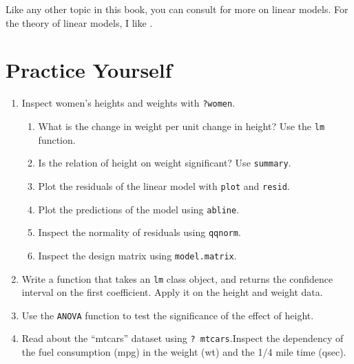 \documentclass[]{book}
\providecommand{\tightlist}{%
  \setlength{\itemsep}{0pt}\setlength{\parskip}{0pt}}
\theoremstyle{definition}
\theoremstyle{definition}
\theoremstyle{definition}
\theoremstyle{remark}
\begin{document}
Like any other topic in this book, you can consult
\citet{venables2013modern} for more on linear models. For the theory of
linear models, I like \citet{greene2003econometric}.

\section{Practice Yourself}\label{practice-yourself-3}

\begin{enumerate}
\def\labelenumi{\arabic{enumi}.}
\item
  Inspect women's heights and weights with \texttt{?women}.

  \begin{enumerate}
  \def\labelenumii{\arabic{enumii}.}
  \tightlist
  \item
    What is the change in weight per unit change in height? Use the
    \texttt{lm} function.
  \item
    Is the relation of height on weight significant? Use
    \texttt{summary}.
  \item
    Plot the residuals of the linear model with \texttt{plot} and
    \texttt{resid}.
  \item
    Plot the predictions of the model using \texttt{abline}.
  \item
    Inspect the normality of residuals using \texttt{qqnorm}.
  \item
    Inspect the design matrix using \texttt{model.matrix}.
  \end{enumerate}
\item
  Write a function that takes an \texttt{lm} class object, and returns
  the confidence interval on the first coefficient. Apply it on the
  height and weight data.
\item
  Use the \texttt{ANOVA} function to test the significance of the effect
  of height.
\item
  Read about the ``mtcars'' dataset using \texttt{?\ mtcars}.Inspect the
  dependency of the fuel consumption (mpg) in the weight (wt) and the
  1/4 mile time (qsec).


\end{enumerate}
\end{document}
